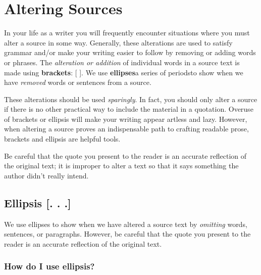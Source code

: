 
\chapter{Altering Sources}

In your life as a writer you will frequently encounter situations where you must
alter a source in some way. Generally, these alterations are used to satisfy
grammar and/or make your writing easier to follow by removing or adding words or
phrases. The \emph{alteration or addition} of individual words in a source text
is made using \textbf{brackets}: [ ]. We use \textbf{ellipses}\textemdash a
series of periods\textemdash to show when we have \emph{removed} words or
sentences from a source.

These alterations should be used \emph{sparingly}. In fact, you should only
alter a source if there is no other practical way to include the material in a
quotation. Overuse of brackets or ellipsis will make your writing appear artless
and lazy. However, when altering a source proves an indispensable path to
crafting readable prose, brackets and ellipsis are helpful tools.

Be careful that the quote you present to the reader is an accurate reflection of
the original text; it is improper to alter a text so that it says something the
author didn’t really intend.

\hypertarget{ellipsis}{}
\section{Ellipsis [. . .]} We use ellipses to show when we have altered a source
text by \emph{omitting} words, sentences, or paragraphs. However, be careful
that the quote you present to the reader is an accurate reflection of the
original text.

\subsection{How do I use ellipsis?}

